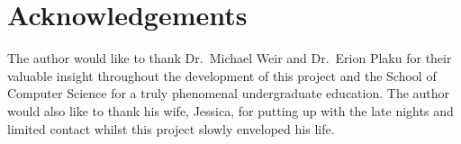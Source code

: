


\chapter{Acknowledgements}

\label{chapter:ack}

The author would like to thank Dr.\ Michael Weir and Dr.\ Erion Plaku for their
valuable insight throughout the development of this project and the School of
Computer Science for a truly phenomenal undergraduate education. The author
would also like to thank his wife, Jessica, for putting up with the late nights
and limited contact whilst this project slowly enveloped his life.


